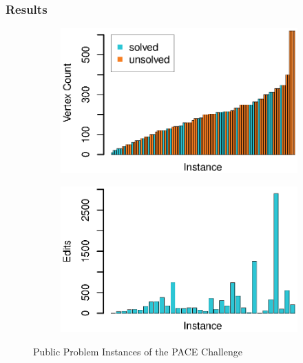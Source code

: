 \documentclass{beamer}
\begin{document}
\begin{frame}
	\frametitle{Results}
	\begin{figure}[h]
		\begin{subfigure}{0.49\textwidth}
			\includegraphics[width=1.0\linewidth]{instances}
		\end{subfigure}
		\begin{subfigure}{0.49\textwidth}
			\includegraphics[width=1.0\linewidth]{solution_sizes}
		\end{subfigure}

		\caption{Public Problem Instances of the PACE Challenge}
		\label{fig:instances}
	\end{figure}
\end{frame}
\end{document}
